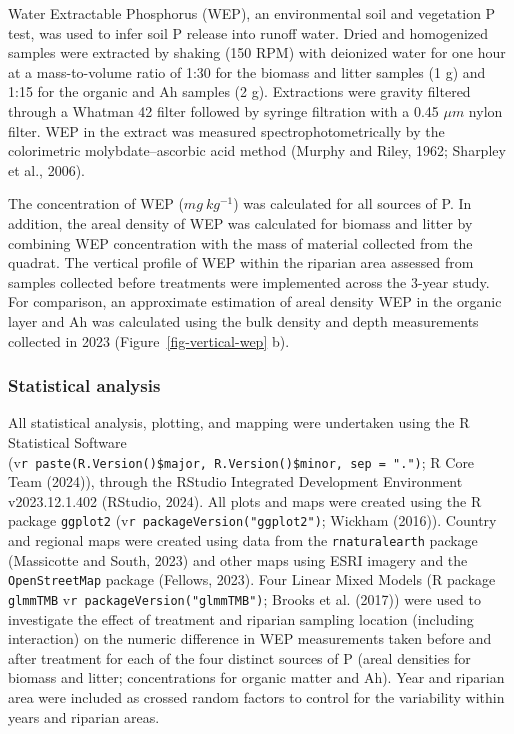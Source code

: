 \documentclass[
]{agujournal2019}
\begin{document}
Water Extractable Phosphorus (WEP), an environmental soil and vegetation
P test, was used to infer soil P release into runoff water. Dried and
homogenized samples were extracted by shaking (150 RPM) with deionized
water for one hour at a mass-to-volume ratio of 1:30 for the biomass and
litter samples (1 g) and 1:15 for the organic and Ah samples (2 g).
Extractions were gravity filtered through a Whatman 42 filter followed
by syringe filtration with a 0.45 \(\mu m\) nylon filter. WEP in the
extract was measured spectrophotometrically by the colorimetric
molybdate--ascorbic acid method (Murphy and Riley, 1962; Sharpley et
al., 2006).

The concentration of WEP (\(mg~kg^{-1}\)) was calculated for all sources
of P. In addition, the areal density of WEP was calculated for biomass
and litter by combining WEP concentration with the mass of material
collected from the quadrat. The vertical profile of WEP within the
riparian area assessed from samples collected before treatments were
implemented across the 3-year study. For comparison, an approximate
estimation of areal density WEP in the organic layer and Ah was
calculated using the bulk density and depth measurements collected in
2023 (Figure~\ref{fig-vertical-wep} b).

\subsubsection{Statistical analysis}\label{statistical-analysis}

All statistical analysis, plotting, and mapping were undertaken using
the R Statistical Software
(v\texttt{r\ paste(R.Version()\$major,\ R.Version()\$minor,\ sep\ =\ ".")};
R Core Team (2024)), through the RStudio Integrated Development
Environment v2023.12.1.402 (RStudio, 2024). All plots and maps were
created using the R package \texttt{ggplot2}
(v\texttt{r\ packageVersion("ggplot2")}; Wickham (2016)). Country and
regional maps were created using data from the \texttt{rnaturalearth}
package (Massicotte and South, 2023) and other maps using ESRI imagery
and the \texttt{OpenStreetMap} package (Fellows, 2023). Four Linear
Mixed Models (R package \texttt{glmmTMB}
v\texttt{r\ packageVersion("glmmTMB")}; Brooks et al. (2017)) were used
to investigate the effect of treatment and riparian sampling location
(including interaction) on the numeric difference in WEP measurements
taken before and after treatment for each of the four distinct sources
of P (areal densities for biomass and litter; concentrations for organic
matter and Ah). Year and riparian area were included as crossed random
factors to control for the variability within years and riparian areas.
\end{document}
